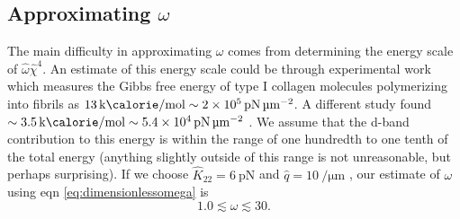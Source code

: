 \documentclass[12pt]{article}
\begin{document}
\subsection{Approximating $\omega$}
The main difficulty in approximating $\omega$ comes from determining the energy scale of $\hat{\omega}\hat{\chi}^4$. An estimate of this energy scale could be through experimental work \cite{Kadler:1987ui} which measures the Gibbs free energy of type I collagen molecules polymerizing into fibrils as $\SI{13}{\kilo\calorie\per\mole}\sim\SI{2e5}{\pico\newton\per\micro\meter\squared}$. A different study found $\sim\SI{3.5}{\kilo\calorie\per\mole}\sim\SI{5.4e4}{\pico\newton\per\micro\meter\squared}$ \cite{Leikin:1995id}. We assume that the d-band contribution to this energy is within the range of one hundredth to one tenth of the total energy (anything slightly outside of this range is not unreasonable, but perhaps surprising). If we choose $\hat{K}_{22}=\SI{6}{\pico\newton}$ and $\hat{q}=\SI{10}{\per\micro\meter}$ \cite{Cameron:2018kq}, our estimate of $\omega$ using eqn \ref{eq:dimensionlessomega} is
\begin{equation}\label{eq:omega}
1.0\lesssim\omega\lesssim30.
\end{equation}
\end{document}
